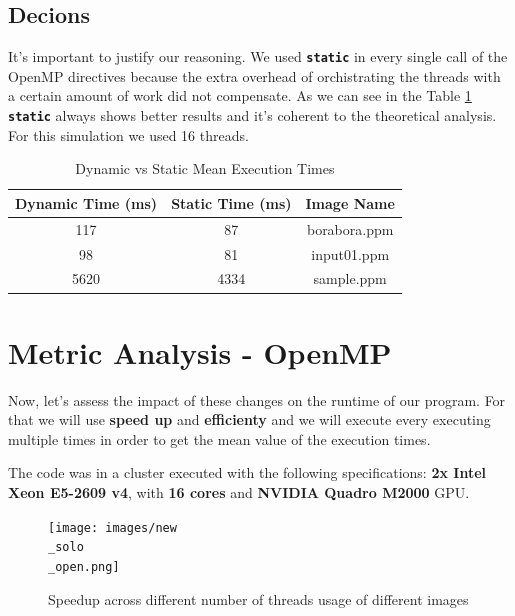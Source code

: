 \documentclass[sigconf]{acmart}
\begin{document}
\subsection{Decions}
It's important to justify our reasoning. We used \texttt{\textbf{static}} in every single call of the OpenMP directives because the extra overhead of orchistrating the threads with a certain amount of work did not compensate. As we can see in the Table \ref{table:staticanddynamic} \texttt{\textbf{static}} always shows better results and it's coherent to the theoretical analysis. For this simulation we used 16 threads.

\begin{table}[h!]
\centering
\begin{tabular}{|c|c|c|}
\hline
\textbf{Dynamic Time (ms)} & \textbf{Static Time (ms)} & \textbf{Image Name} \\
\hline
117 & 87& borabora.ppm \\
\hline
98 & 81 & input01.ppm \\
\hline
5620 & 4334 & sample.ppm \\
\hline
\end{tabular}
\vspace{0.2cm} %
\caption{Dynamic vs Static Mean Execution Times}
\label{table:staticanddynamic}
\end{table}

\section{Metric Analysis - OpenMP}
Now, let's assess the impact of these changes on the runtime of our program. For that we will use \textbf{speed up} and \textbf{efficienty} and we will execute every executing multiple times in order to get the mean value of the execution times.

The code was in a cluster executed with the following specifications: \textbf{2x Intel Xeon E5-2609 v4}, with \textbf{16 cores} and \textbf{NVIDIA Quadro M2000} GPU.

\begin{figure}[h]
  \centering
  \texttt{[image: images/new\\\_solo\\\_open.png]}
  \caption{Speedup across different number of threads usage of different images}
 \label{fig1}
\end{figure}
\end{document}

